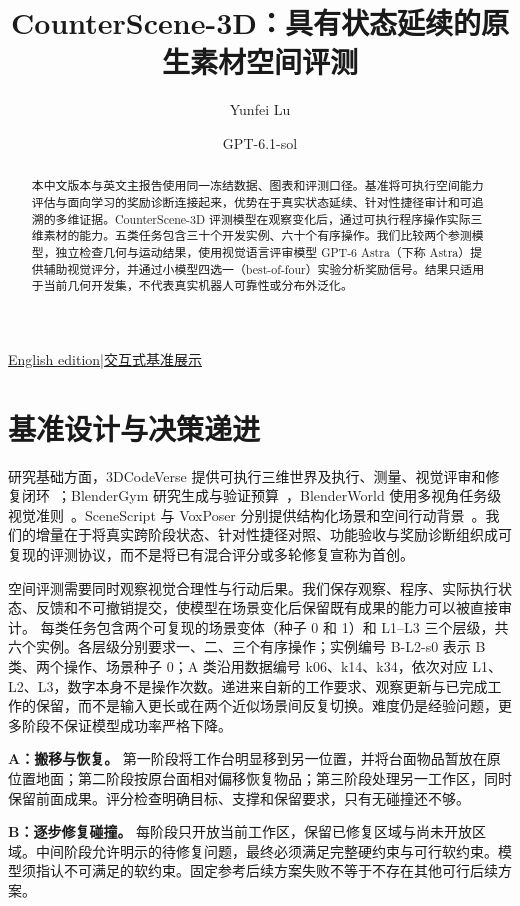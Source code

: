 \documentclass[10pt]{article}
\title{CounterScene-3D：具有状态延续的原生素材空间评测}
\author{Yunfei Lu \and GPT-6.1-sol}\date{}
\begin{document}
\maketitle
\begin{center}\small\href{report.pdf}{English edition}\quad|\quad\href{https://mikelyfei.github.io/CounterScene-3D/}{交互式基准展示}\end{center}
\begin{abstract}
本中文版本与英文主报告使用同一冻结数据、图表和评测口径。基准将可执行空间能力评估与面向学习的奖励诊断连接起来，优势在于真实状态延续、针对性捷径审计和可追溯的多维证据。CounterScene-3D 评测模型在观察变化后，通过可执行程序操作实际三维素材的能力。五类任务包含三十个开发实例、六十个有序操作。我们比较两个参测模型，独立检查几何与运动结果，使用视觉语言评审模型 GPT-6 Astra（下称 Astra）提供辅助视觉评分，并通过小模型四选一（best-of-four）实验分析奖励信号。结果只适用于当前几何开发集，不代表真实机器人可靠性或分布外泛化。
\end{abstract}
\section{基准设计与决策递进}
研究基础方面，3DCodeVerse 提供可执行三维世界及执行、测量、视觉评审和修复闭环~\cite{codeverse}；BlenderGym 研究生成与验证预算~\cite{blendergym}，BlenderWorld 使用多视角任务级视觉准则~\cite{blenderworld}。SceneScript 与 VoxPoser 分别提供结构化场景和空间行动背景~\cite{scenescript,voxposer}。我们的增量在于将真实跨阶段状态、针对性捷径对照、功能验收与奖励诊断组织成可复现的评测协议，而不是将已有混合评分或多轮修复宣称为首创。

空间评测需要同时观察视觉合理性与行动后果。我们保存观察、程序、实际执行状态、反馈和不可撤销提交，使模型在场景变化后保留既有成果的能力可以被直接审计。
每类任务包含两个可复现的场景变体（种子 0 和 1）和 L1--L3 三个层级，共六个实例。各层级分别要求一、二、三个有序操作；实例编号 B-L2-s0 表示 B 类、两个操作、场景种子 0；A 类沿用数据编号 k06、k14、k34，依次对应 L1、L2、L3，数字本身不是操作次数。递进来自新的工作要求、观察更新与已完成工作的保留，而不是输入更长或在两个近似场景间反复切换。难度仍是经验问题，更多阶段不保证模型成功率严格下降。

\textbf{A：搬移与恢复。} 第一阶段将工作台明显移到另一位置，并将台面物品暂放在原位置地面；第二阶段按原台面相对偏移恢复物品；第三阶段处理另一工作区，同时保留前面成果。评分检查明确目标、支撑和保留要求，只有无碰撞还不够。

\textbf{B：逐步修复碰撞。} 每阶段只开放当前工作区，保留已修复区域与尚未开放区域。中间阶段允许明示的待修复问题，最终必须满足完整硬约束与可行软约束。模型须指认不可满足的软约束。固定参考后续方案失败不等于不存在其他可行后续方案。
\end{document}
